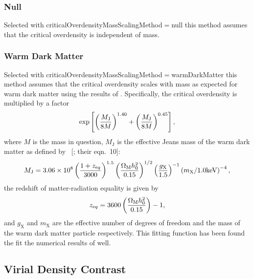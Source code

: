 \subsubsection{Null}

Selected with {\normalfont \ttfamily criticalOverdensityMassScalingMethod}$=${\normalfont \ttfamily null} this method assumes that the critical overdensity is independent of mass.

\subsubsection{Warm Dark Matter}

Selected with {\normalfont \ttfamily criticalOverdensityMassScalingMethod}$=${\normalfont \ttfamily warmDarkMatter} this method assumes that the critical overdensity scales with mass as expected for warm dark matter using the results of \cite{barkana_constraints_2001}. Specifically, the critical overdensity is multiplied by a factor
\begin{equation}
 \exp\left[ \left({M_{\mathrm J} \over 8 M}\right)^{1.40}+\left({M_{\mathrm J} \over 8 M}\right)^{0.45} \right],
\end{equation}
where $M$ is the mass in question, $M_{\mathrm J}$ is the effective Jeans mass of the warm dark matter as defined by \citeauthor{barkana_constraints_2001}~[\citeyear{barkana_constraints_2001}; their eqn.~10]:
\begin{equation}
M_{\mathrm J} =  3.06 \times 10^8 \left( {1+z_{\mathrm eq} \over 3000}\right)^{1.5} \left({\Omega_{\mathrm M} h_0^2 \over 0.15}\right)^{1/2} \left({g_{\mathrm X} \over 1.5} \right)^{-1} \left({m_{\mathrm X}/1.0\hbox{keV}}\right)^{-4},
\end{equation}
the redshift of matter-radiation equality is given by
\begin{equation}
z_{\mathrm eq} = 3600 \left({\Omega_{\mathrm M} h_0^2 \over 0.15}\right)-1,
\end{equation}
and $g_{\mathrm X}$ and $m_{\mathrm X}$ are the effective number of degrees of freedom and the mass of the warm dark matter particle respectively. This fitting function has been found the fit the numerical results of \cite{barkana_constraints_2001} well.

\subsection{Virial Density Contrast}\label{sec:VirialDensityConstrast}

